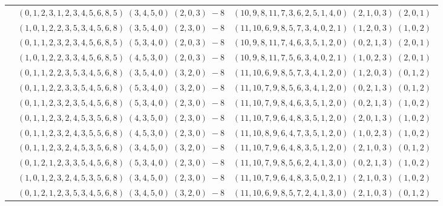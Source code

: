 \documentclass[11pt]{article}
\begin{document}
\begin{longtable}[l]{|c|c|c|}
 \cline{2-3} 
 & $(0 ,1 ,2 ,3 ,1 ,2 ,3 ,4 ,5 ,6 ,8 ,5) \;(3 ,4 ,5 ,0) \;(2 ,0 ,3) \;-8$ & $(10 ,9 ,8 ,11 ,7 ,3 ,6 ,2 ,5 ,1 ,4 ,0) \;(2 ,1 ,0 ,3) \;(2 ,0 ,1) \;$\\ 
 \cline{2-3} 
 & $(1 ,0 ,1 ,2 ,2 ,3 ,5 ,3 ,4 ,5 ,6 ,8) \;(3 ,5 ,4 ,0) \;(2 ,3 ,0) \;-8$ & $(11 ,10 ,6 ,9 ,8 ,5 ,7 ,3 ,4 ,0 ,2 ,1) \;(1 ,2 ,0 ,3) \;(1 ,0 ,2) \;$\\ 
 \cline{2-3} 
 & $(0 ,1 ,1 ,2 ,3 ,2 ,3 ,4 ,5 ,6 ,8 ,5) \;(5 ,3 ,4 ,0) \;(2 ,0 ,3) \;-8$ & $(10 ,9 ,8 ,11 ,7 ,4 ,6 ,3 ,5 ,1 ,2 ,0) \;(0 ,2 ,1 ,3) \;(2 ,0 ,1) \;$\\ 
 \cline{2-3} 
 & $(1 ,0 ,1 ,2 ,2 ,3 ,3 ,4 ,5 ,6 ,8 ,5) \;(4 ,5 ,3 ,0) \;(2 ,0 ,3) \;-8$ & $(10 ,9 ,8 ,11 ,7 ,5 ,6 ,3 ,4 ,0 ,2 ,1) \;(1 ,0 ,2 ,3) \;(2 ,0 ,1) \;$\\ 
 \cline{2-3} 
 & $(0 ,1 ,1 ,2 ,2 ,3 ,5 ,3 ,4 ,5 ,6 ,8) \;(3 ,5 ,4 ,0) \;(3 ,2 ,0) \;-8$ & $(11 ,10 ,6 ,9 ,8 ,5 ,7 ,3 ,4 ,1 ,2 ,0) \;(1 ,2 ,0 ,3) \;(0 ,1 ,2) \;$\\ 
 \cline{2-3} 
 & $(0 ,1 ,1 ,2 ,2 ,3 ,3 ,5 ,4 ,5 ,6 ,8) \;(5 ,3 ,4 ,0) \;(3 ,2 ,0) \;-8$ & $(11 ,10 ,7 ,9 ,8 ,5 ,6 ,3 ,4 ,1 ,2 ,0) \;(0 ,2 ,1 ,3) \;(0 ,1 ,2) \;$\\ 
 \cline{2-3} 
 & $(0 ,1 ,1 ,2 ,3 ,2 ,3 ,5 ,4 ,5 ,6 ,8) \;(5 ,3 ,4 ,0) \;(2 ,3 ,0) \;-8$ & $(11 ,10 ,7 ,9 ,8 ,4 ,6 ,3 ,5 ,1 ,2 ,0) \;(0 ,2 ,1 ,3) \;(1 ,0 ,2) \;$\\ 
 \cline{2-3} 
 & $(0 ,1 ,1 ,2 ,3 ,2 ,4 ,5 ,3 ,5 ,6 ,8) \;(4 ,3 ,5 ,0) \;(2 ,3 ,0) \;-8$ & $(11 ,10 ,7 ,9 ,6 ,4 ,8 ,3 ,5 ,1 ,2 ,0) \;(2 ,0 ,1 ,3) \;(1 ,0 ,2) \;$\\ 
 \cline{2-3} 
 & $(0 ,1 ,1 ,2 ,3 ,2 ,4 ,3 ,5 ,5 ,6 ,8) \;(4 ,5 ,3 ,0) \;(2 ,3 ,0) \;-8$ & $(11 ,10 ,8 ,9 ,6 ,4 ,7 ,3 ,5 ,1 ,2 ,0) \;(1 ,0 ,2 ,3) \;(1 ,0 ,2) \;$\\ 
 \cline{2-3} 
 & $(0 ,1 ,1 ,2 ,3 ,2 ,4 ,5 ,3 ,5 ,6 ,8) \;(3 ,4 ,5 ,0) \;(3 ,2 ,0) \;-8$ & $(11 ,10 ,7 ,9 ,6 ,4 ,8 ,3 ,5 ,1 ,2 ,0) \;(2 ,1 ,0 ,3) \;(0 ,1 ,2) \;$\\ 
 \cline{2-3} 
 & $(0 ,1 ,2 ,1 ,2 ,3 ,3 ,5 ,4 ,5 ,6 ,8) \;(5 ,3 ,4 ,0) \;(2 ,3 ,0) \;-8$ & $(11 ,10 ,7 ,9 ,8 ,5 ,6 ,2 ,4 ,1 ,3 ,0) \;(0 ,2 ,1 ,3) \;(1 ,0 ,2) \;$\\ 
 \cline{2-3} 
 & $(1 ,0 ,1 ,2 ,3 ,2 ,4 ,5 ,3 ,5 ,6 ,8) \;(3 ,4 ,5 ,0) \;(2 ,3 ,0) \;-8$ & $(11 ,10 ,7 ,9 ,6 ,4 ,8 ,3 ,5 ,0 ,2 ,1) \;(2 ,1 ,0 ,3) \;(1 ,0 ,2) \;$\\ 
 \cline{2-3} 
 & $(0 ,1 ,2 ,1 ,2 ,3 ,5 ,3 ,4 ,5 ,6 ,8) \;(3 ,4 ,5 ,0) \;(3 ,2 ,0) \;-8$ & $(11 ,10 ,6 ,9 ,8 ,5 ,7 ,2 ,4 ,1 ,3 ,0) \;(2 ,1 ,0 ,3) \;(0 ,1 ,2) \;$\\ 

\end{longtable}
\end{document}
